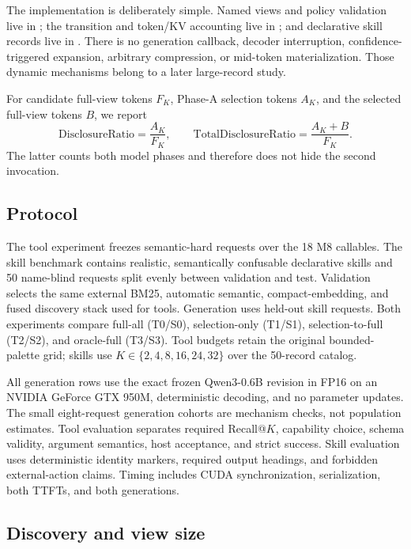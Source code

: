 The implementation is deliberately simple. Named views and policy validation
live in ; the transition and token/KV
accounting live in ; and declarative
skill records live in . There is no generation
callback, decoder interruption, confidence-triggered expansion, arbitrary
compression, or mid-token materialization. Those dynamic mechanisms belong to
a later large-record study.

For candidate full-view tokens $F_K$, Phase-A selection tokens $A_K$, and the
selected full-view tokens $B$, we report
\[
  \mathrm{DisclosureRatio}=\frac{A_K}{F_K},\qquad
  \mathrm{TotalDisclosureRatio}=\frac{A_K+B}{F_K}.
\]
The latter counts both model phases and therefore does not hide the second
invocation.

\subsection{Protocol}

The tool experiment freezes \PaperSixFiveMNineToolCases{} semantic-hard requests
over the 18 M8 callables. The skill benchmark contains
\PaperSixFiveMNineSkillCatalog{} realistic, semantically confusable declarative
skills and 50 name-blind requests split evenly between validation and test.
Validation selects the same external BM25, automatic semantic, compact-embedding,
and fused discovery stack used for tools. Generation uses
\PaperSixFiveMNineSkillCases{} held-out skill requests. Both experiments compare
full-all (T0/S0), selection-only (T1/S1), selection-to-full (T2/S2), and
oracle-full (T3/S3). Tool budgets retain the original bounded-palette grid;
skills use $K\in\{2,4,8,16,24,32\}$ over the 50-record catalog.

All generation rows use the exact frozen Qwen3-0.6B revision in FP16 on an
NVIDIA GeForce GTX 950M, deterministic decoding, and no parameter updates. The
small eight-request generation cohorts are mechanism checks, not population
estimates. Tool evaluation separates required Recall@$K$, capability choice,
schema validity, argument semantics, host acceptance, and strict success. Skill
evaluation uses deterministic identity markers, required output headings, and
forbidden external-action claims. Timing includes CUDA synchronization,
serialization, both TTFTs, and both generations.

\subsection{Discovery and view size}

